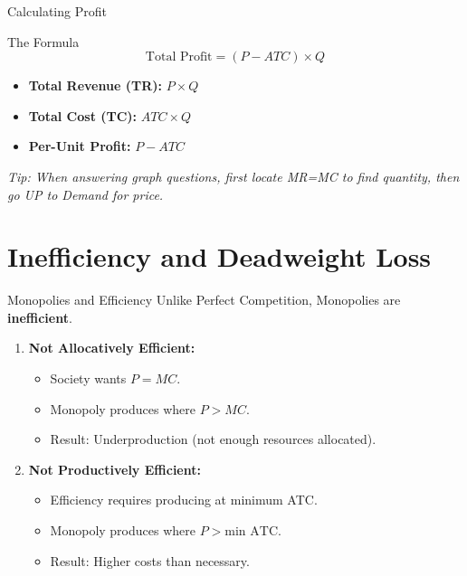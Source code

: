 \documentclass[aspectratio=169, 10pt]{beamer}
\begin{document}
\begin{frame}{Calculating Profit}
    \begin{block}{The Formula}
    $$ \text{Total Profit} = (P - ATC) \times Q $$
    \end{block}
    
    \begin{itemize}
        \item \textbf{Total Revenue (TR):} $P \times Q$
        \item \textbf{Total Cost (TC):} $ATC \times Q$
        \item \textbf{Per-Unit Profit:} $P - ATC$
    \end{itemize}
    \vspace{0.5cm}
    \textit{Tip: When answering graph questions, first locate MR=MC to find quantity, then go UP to Demand for price.}
\end{frame}

\section{Inefficiency and Deadweight Loss}

\begin{frame}{Monopolies and Efficiency}
    Unlike Perfect Competition, Monopolies are \textbf{inefficient}.
    
    \vspace{0.5cm}
    \begin{enumerate}
        \item \textbf{Not Allocatively Efficient:}
        \begin{itemize}
            \item Society wants $P = MC$.
            \item Monopoly produces where $P > MC$.
            \item Result: Underproduction (not enough resources allocated).
        \end{itemize}
        \vspace{0.2cm}
        \item \textbf{Not Productively Efficient:}
        \begin{itemize}
            \item Efficiency requires producing at minimum ATC.
            \item Monopoly produces where $P > \text{min ATC}$.
            \item Result: Higher costs than necessary.
        \end{itemize}
    \end{enumerate}
\end{frame}
\end{document}
